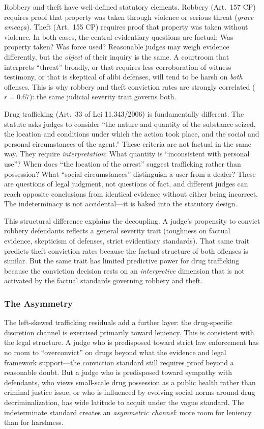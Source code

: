 \documentclass[12pt]{article}
\begin{document}
Robbery and theft have well-defined statutory elements. Robbery (Art.\ 157 CP) requires proof that property was taken through violence or serious threat (\textit{grave amea\c{c}a}). Theft (Art.\ 155 CP) requires proof that property was taken without violence. In both cases, the central evidentiary questions are factual: Was property taken? Was force used? Reasonable judges may weigh evidence differently, but the \textit{object} of their inquiry is the same. A courtroom that interprets ``threat'' broadly, or that requires less corroboration of witness testimony, or that is skeptical of alibi defenses, will tend to be harsh on \textit{both} offenses. This is why robbery and theft conviction rates are strongly correlated ($r = 0.67$): the same judicial severity trait governs both.

Drug trafficking (Art.\ 33 of Lei 11.343/2006) is fundamentally different. The statute asks judges to consider ``the nature and quantity of the substance seized, the location and conditions under which the action took place, and the social and personal circumstances of the agent.'' These criteria are not factual in the same way. They require \textit{interpretation}: What quantity is ``inconsistent with personal use''? When does ``the location of the arrest'' suggest trafficking rather than possession? What ``social circumstances'' distinguish a user from a dealer? These are questions of legal judgment, not questions of fact, and different judges can reach opposite conclusions from identical evidence without either being incorrect. The indeterminacy is not accidental---it is baked into the statutory design.

This structural difference explains the decoupling. A judge's propensity to convict robbery defendants reflects a general severity trait (toughness on factual evidence, skepticism of defenses, strict evidentiary standards). That same trait predicts theft conviction rates because the factual structure of both offenses is similar. But the same trait has limited predictive power for drug trafficking because the conviction decision rests on an \textit{interpretive} dimension that is not activated by the factual standards governing robbery and theft.

\subsubsection*{The Asymmetry} The left-skewed trafficking residuals add a further layer: the drug-specific discretion channel is exercised primarily toward leniency. This is consistent with the legal structure. A judge who is predisposed toward strict law enforcement has no room to ``overconvict'' on drugs beyond what the evidence and legal framework support---the conviction standard still requires proof beyond a reasonable doubt. But a judge who is predisposed toward sympathy with defendants, who views small-scale drug possession as a public health rather than criminal justice issue, or who is influenced by evolving social norms around drug decriminalization, has wide latitude to acquit under the vague standard. The indeterminate standard creates an \textit{asymmetric channel}: more room for leniency than for harshness.
\end{document}

